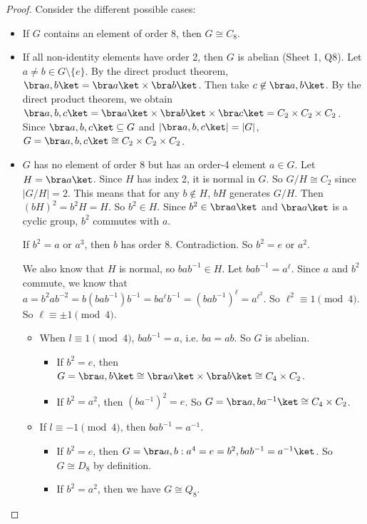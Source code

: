 \documentclass[a4pape]{article}
\begin{document}
\begin{proof}
  Consider the different possible cases:
  \begin{itemize}
  \item If $G$ contains an element of order 8, then $G\cong C_8$.
  \item If all non-identity elements have order 2, then $G$ is abelian (Sheet 1, Q8). Let $a\not= b\in G\setminus\{e\}$. By the direct product theorem, $\bra a, b\ket = \bra a\ket\times\bra b\ket$. Then take $c\not\in \bra a, b\ket$. By the direct product theorem, we obtain $\bra a, b, c\ket = \bra a\ket\times\bra b\ket\times\bra c\ket = C_2\times C_2\times C_2$. Since $\bra a, b, c\ket\subseteq G$ and $|\bra a, b, c\ket| = |G|$, $G = \bra a, b, c\ket \cong C_2\times C_2\times C_2$.
  \item $G$ has no element of order 8 but has an order-4 element $a\in G$. Let $H = \bra a\ket$. Since $H$ has index 2, it is normal in $G$. So $G/H \cong C_2$ since $|G/H| = 2$. This means that for any $b\not\in H$, $bH$ generates $G/H$. Then $(bH)^2 = b^2H = H$. So $b^2\in H$. Since $b^2\in \bra a\ket$ and $\bra a\ket$ is a cyclic group, $b^2$ commutes with $a$.

If $b^2 = a$ or $a^3$, then $b$ has order 8. Contradiction. So $b^2 = e$ or $a^2$.

We also know that $H$ is normal, so $bab^{-1}\in H$. Let $bab^{-1} = a^\ell$. Since $a$ and $b^2$ commute, we know that $a = b^2 ab^{-2}  = b(bab^{-1})b^{-1} = ba^\ell b^{-1} = (bab^{-1})^{\ell} = a^{\ell^2}$. So $\ell^2 \equiv 1\pmod 4$. So $\ell \equiv \pm 1 \pmod 4$.

    \begin{itemize}
    \item When $l\equiv 1\pmod 4$, $bab^{-1} = a$, i.e. $ba = ab$. So $G$ is abelian.
      \begin{itemize}
      \item  If $b^2 = e$, then $G = \bra a, b\ket \cong \bra a\ket \times \bra b\ket \cong C_4\times C_2$.
      \item If $b^2 = a^2$, then $(ba^{-1})^2 = e$. So $G = \bra a, ba^{-1}\ket \cong C_4\times C_2$.
      \end{itemize}
    \item If $l \equiv -1\pmod 4$, then $bab^{-1} = a^{-1}$. 
      \begin{itemize}
      \item If $b^2 = e$, then $G = \bra a, b: a^4 = e = b^2, bab^{-1} = a^{-1}\ket$. So $G\cong D_8$ by definition.
      \item If $b^2 = a^2$, then we have $G\cong Q_8$. 
      \end{itemize}
    \end{itemize}
  \end{itemize}
\end{proof}
\end{document}
